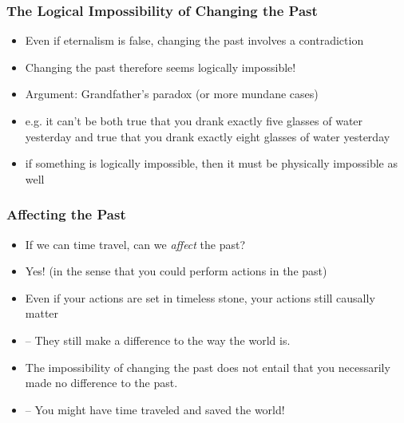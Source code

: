 \begin{frame}
\frametitle{The Logical Impossibility of Changing the Past}

\begin{itemize}[<+->]

\item Even if eternalism is false, changing the past involves a contradiction

\item Changing the past therefore seems logically impossible!

\item Argument: Grandfather's paradox (or more mundane cases)

\item e.g. it can't be both true that you drank exactly five glasses of water yesterday and true that you drank exactly eight glasses of water yesterday

\item if something is logically impossible, then it must be physically impossible as well

\end{itemize}
\end{frame}

\begin{frame}
\frametitle{Affecting the Past}

\begin{itemize}[<+->]

\item If we can time travel, can we \textit{affect} the past?

\item Yes! (in the sense that you could perform actions in the past)

\item Even if your actions are set in timeless stone, your actions still causally matter 
\item[] -- They still make a difference to the way the world is.
\item The impossibility of changing the past does not entail that you necessarily made no difference to the past. 
\item[] -- You might have time traveled and saved the world! 

\end{itemize}
\end{frame}

